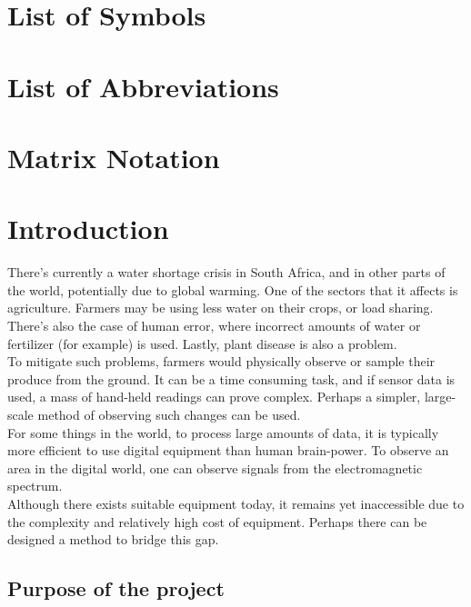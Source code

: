 \tableofcontents
\listoffigures
\listoftables
\section*{List of Symbols}
\section*{List of Abbreviations}
\section*{Matrix Notation}

\newpage


\section{Introduction}

There's currently a water shortage crisis in South Africa, and in other parts of the world, potentially due to global warming. One of the sectors that it affects is agriculture. Farmers may be using less water on their crops, or load sharing. There's also the case of human error, where incorrect amounts of water or fertilizer (for example) is used. Lastly, plant disease is also a problem.\\

\noindent
To mitigate such problems, farmers would physically observe or sample their produce from the ground. It can be a time consuming task, and if sensor data is used, a mass of hand-held readings can prove complex. Perhaps a simpler, large-scale method of observing such changes can be used.\\

\noindent
For some things in the world, to process large amounts of data, it is typically more efficient to use digital equipment than human brain-power. To observe an area in the digital world, one can observe signals from the electromagnetic spectrum.\\

\noindent
Although there exists suitable equipment today, it remains yet inaccessible due to the complexity and relatively high cost of equipment. Perhaps there can be designed a method to bridge this gap.

\subsection{Purpose of the project}

